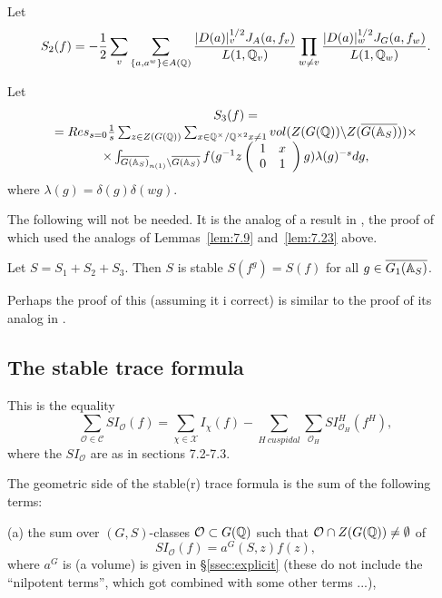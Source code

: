 Let
\begin{equation}\label{eq:7.23}
S_2(f)=
-{1\over 2}
\sum_v \sum_{\{a,a^w\}\in A(\mathbb{Q} )}
{|D(a)|^{1/2}_v
J_A(a,f_v)\over L(1,\mathbb{Q} _v)}
\prod_{w\not= v}
{|D(a)|^{1/2}_w J_G(a,f_w)\over L(1,\mathbb{Q} _w)}.
\end{equation}

Let
\begin{equation}\label{eq:7.24}
\begin{array}{c}
S_3(f)=\\
=Res_{s=0}{1\over s}
\sum_{z\in Z(G(\mathbb{Q} ))}
\sum_{
x\in \mathbb{Q} ^\times /\mathbb{Q} ^{\times 2}
x\not= 1 }
vol(Z(G(\mathbb{Q} ))\backslash Z(\overline{G(\mathbb{A} _S)}))\times \\
\times
\int_{\overline{G(\mathbb{A} _S)}_{n(1)}
\backslash \overline{G(\mathbb{A} _S)}}
f(g^{-1}z
\left(
\begin{array}{cc}
1&x\\ 0&1
\end{array}
\right)
 g)\lambda(g)^{-s}dg ,
\end{array}
\end{equation}
where $\lambda(g)=\delta(g)\delta(wg)$.

The following will not be needed. It is the analog of a result in
\cite{LL}, the proof of which used the analogs of Lemmas~\ref{lem:7.9}
and~\ref{lem:7.23} above.
\begin{conjecture}\label{conj:7.24}
Let $S=S_1+S_2+S_3$. Then $S$ is stable
$S(f^g)=S(f)$ for all $g\in \overline{G_1(\mathbb{A} _S)}$.
\end{conjecture}

Perhaps the proof of this (assuming it i correct)
is similar to the proof of its analog in \cite{LL}.

\subsection{The stable trace formula}\label{ssec:stabletf}

This is the equality 
\begin{equation}\label{eq:7.25}
\sum_{\mathcal{O}\in \mathcal{C}}SI_{\mathcal{O}}(f)
=\sum_{\chi \in {\mathcal{X}}}I_\chi (f)
-\sum_{H\ cuspidal}\sum_{{\mathcal O}_H}SI_{{\mathcal O}_H}^H(f^H),
\end{equation}
where the $SI_{\mathcal{O}}$ are as in sections 7.2-7.3.

The geometric side of the stable(r)
trace formula is the sum of the following terms:

(a) the sum over $(G,S)$-classes ${\mathcal{O}}\subset G(\mathbb{Q} )$
such that ${\mathcal{O}}\cap Z(G(\mathbb{Q} ))\not= \emptyset$ of
\begin{equation}\label{eq:7.26}
SI_{\mathcal{O}}(f)=
a^G(S,z)f(z),
\end{equation}
where $a^G$ is (a volume) is given in \S\ref{ssec:explicit} 
(these do not include the ``nilpotent terms'', which
got combined with some other terms ...),

